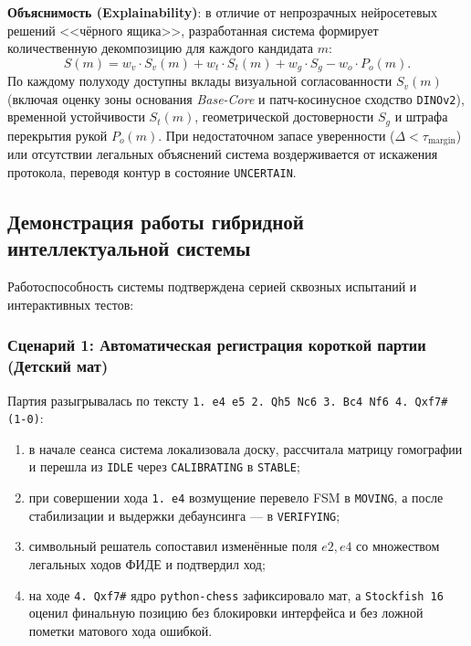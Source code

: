 \textbf{Объяснимость (Explainability)}: в отличие от непрозрачных нейросетевых решений <<чёрного ящика>>, разработанная система формирует количественную декомпозицию для каждого кандидата $m$:
\begin{equation}
S(m) = w_v \cdot S_v(m) + w_t \cdot S_t(m) + w_g \cdot S_g - w_o \cdot P_o(m).
\end{equation}
По каждому полуходу доступны вклады визуальной согласованности $S_v(m)$ (включая оценку зоны основания \textit{Base-Core} и патч-косинусное сходство \texttt{DINOv2}), временной устойчивости $S_t(m)$, геометрической достоверности $S_g$ и штрафа перекрытия рукой $P_o(m)$. При недостаточном запасе уверенности ($\Delta < \tau_{\text{margin}}$) или отсутствии легальных объяснений система воздерживается от искажения протокола, переводя контур в состояние \texttt{UNCERTAIN}.

\subsection{Демонстрация работы гибридной интеллектуальной системы}

Работоспособность системы подтверждена серией сквозных испытаний и интерактивных тестов:

\subsubsection{Сценарий 1: Автоматическая регистрация короткой партии (Детский мат)}
Партия разыгрывалась по тексту \texttt{1. e4 e5 2. Qh5 Nc6 3. Bc4 Nf6 4. Qxf7\# (1-0)}:
\begin{enumerate}
    \item в начале сеанса система локализовала доску, рассчитала матрицу гомографии и перешла из \texttt{IDLE} через \texttt{CALIBRATING} в \texttt{STABLE};
    \item при совершении хода \texttt{1. e4} возмущение перевело FSM в \texttt{MOVING}, а после стабилизации и выдержки дебаунсинга --- в \texttt{VERIFYING};
    \item символьный решатель сопоставил изменённые поля $e2, e4$ со множеством легальных ходов ФИДЕ и подтвердил ход;
    \item на ходе \texttt{4. Qxf7\#} ядро \texttt{python-chess} зафиксировало мат, а \texttt{Stockfish~16} оценил финальную позицию без блокировки интерфейса и без ложной пометки матового хода ошибкой.
\end{enumerate}

